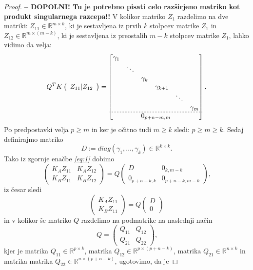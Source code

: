 \documentclass[mat1]{article}
\begin{document}
\begin{proof}
\textbf{-- DOPOLNI! Tu je potrebno pisati celo razširjeno matriko kot produkt singularnega razcepa!!}
V kolikor matriko $Z_1$ razdelimo na dve matriki: $Z_{11} \in \mathbb{R}^{m \times k}$, ki je sestavljena iz prvih $k$ stolpcev matrike $Z_1$ in $Z_{12} \in \mathbb{R}^{m \times (m-k)}$, ki je sestavljena iz preostalih $m-k$ stolpcev matrike $Z_1$, lahko vidimo da velja:
$$ Q^T K \left(\begin{array}{c} Z_{11} | Z_{12} \end{array}\right) = 
\begin{bmatrix}
\begin{matrix}
\gamma_1 & & & & & \\
 & \ddots & & & & \\
 & & \gamma_k & & & \\
 & & & \gamma_{k+1} & & \\
 & & & & \ddots & \\
 & & & & & \gamma_m 
\end{matrix} \\ \hdashline[2pt/2pt]
0_{p+n-m, m}
\end{bmatrix}
\text{.}
$$
Po predpostavki velja $p \geq m$ in ker je očitno tudi $m \geq k$ sledi: $p \geq m \geq k$. Sedaj definirajmo matriko 
$$ D := diag(\gamma_1,..., \gamma_k) \in \mathbb{R}^{k \times k} \text{.}
$$
Tako iz zgornje enačbe \textit{\eqref{eq:1}} dobimo
\begin{equation}
\begin{pmatrix}
K_A Z_{11} & K_A Z_{12} \\ 
K_B Z_{11} & K_B Z_{12}
\end{pmatrix} = Q
\begin{pmatrix}
D & 0_{k, m-k} \\ 
0_{p+n-k, k} & 0_{p+n-k, m-k} 
\end{pmatrix} \text{,} \label{eq:2}
\end{equation}
iz česar sledi
$$
\begin{pmatrix}
K_A Z_{11} \\ 
K_B Z_{11}
\end{pmatrix} = Q
\begin{pmatrix}
D \\ 
0
\end{pmatrix}
$$ in v kolikor še matriko $Q$ razdelimo na podmatrike na naslednji način
$$ Q = 
\begin{pmatrix}
Q_{11} & Q_{12} \\ 
Q_{21} & Q_{22}
\end{pmatrix} \text{,}
$$ kjer je matrika $Q_{11} \in \mathbb{R}^{p \times k}$, matrika $Q_{12} \in \mathbb{R}^{p \times (p+n-k)}$, matrika $Q_{21} \in \mathbb{R}^{ n \times k}$ in matrika matrika $Q_{22} \in \mathbb{R}^{ n \times (p+n-k)}$, ugotovimo, da je

\end{proof}
\end{document}
